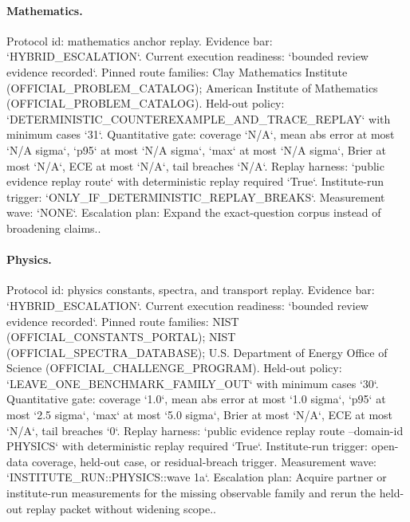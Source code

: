 \paragraph{Mathematics.}
Protocol id: mathematics anchor replay. Evidence bar: `HYBRID\_ESCALATION`. Current execution readiness: `bounded review evidence recorded`.
Pinned route families: Clay Mathematics Institute (OFFICIAL\_PROBLEM\_CATALOG); American Institute of Mathematics (OFFICIAL\_PROBLEM\_CATALOG).
Held-out policy: `DETERMINISTIC\_COUNTEREXAMPLE\_AND\_TRACE\_REPLAY` with minimum cases `31`.
Quantitative gate: coverage `N/A`, mean abs error at most `N/A sigma`, `p95` at most `N/A sigma`, `max` at most `N/A sigma`, Brier at most `N/A`, ECE at most `N/A`, tail breaches `N/A`.
Replay harness: `public evidence replay route` with deterministic replay required `True`.
Institute-run trigger: `ONLY\_IF\_DETERMINISTIC\_REPLAY\_BREAKS`. Measurement wave: `NONE`.
Escalation plan: Expand the exact-question corpus instead of broadening claims..

\paragraph{Physics.}
Protocol id: physics constants, spectra, and transport replay. Evidence bar: `HYBRID\_ESCALATION`. Current execution readiness: `bounded review evidence recorded`.
Pinned route families: NIST (OFFICIAL\_CONSTANTS\_PORTAL); NIST (OFFICIAL\_SPECTRA\_DATABASE); U.S. Department of Energy Office of Science (OFFICIAL\_CHALLENGE\_PROGRAM).
Held-out policy: `LEAVE\_ONE\_BENCHMARK\_FAMILY\_OUT` with minimum cases `30`.
Quantitative gate: coverage `1.0`, mean abs error at most `1.0 sigma`, `p95` at most `2.5 sigma`, `max` at most `5.0 sigma`, Brier at most `N/A`, ECE at most `N/A`, tail breaches `0`.
Replay harness: `public evidence replay route --domain-id PHYSICS` with deterministic replay required `True`.
Institute-run trigger: open-data coverage, held-out case, or residual-breach trigger. Measurement wave: `INSTITUTE\_RUN::PHYSICS::wave 1a`.
Escalation plan: Acquire partner or institute-run measurements for the missing observable family and rerun the held-out replay packet without widening scope..

